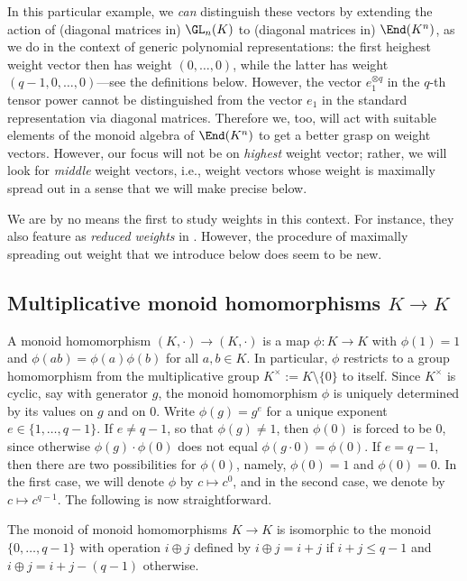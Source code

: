 \documentclass{amsart}
\begin{document}
In this particular example, we {\em can} distinguish these vectors by
extending the action of (diagonal matrices in) $\GL_n(K)$ to (diagonal
matrices in) $\End(K^n)$, as we do in the context of generic polynomial
representations: the first heighest weight vector then has weight
$(0,\ldots,0)$, while the latter has weight $(q-1,0,\ldots,0)$---see
the definitions below. However, the vector $e_1^{\otimes q}$ in the
$q$-th tensor power cannot be distinguished from the vector $e_1$ in
the standard representation via diagonal matrices. Therefore we, too,
will act with suitable elements of the monoid algebra of $\End(K^n)$
to get a better grasp on weight vectors. However, our focus will not be
on {\em highest} weight vector; rather, we will look for {\em middle}
weight vectors, i.e., weight vectors whose weight is
maximally spread out in a sense that we will make precise
below.

We are by no means the first to study weights in this
context. For instance, they also feature as {\em reduced weights} in
\cite{Kuhn94b}. However, the procedure of maximally spreading out weight
that we introduce below does seem to be new.

\subsection{Multiplicative monoid homomorphisms $K \to K$}

A monoid homomorphism $(K, \cdot) \to (K,\cdot)$ is a map $\phi:K \to
K$ with $\phi(1)=1$ and $\phi(ab)=\phi(a) \phi(b)$ for all $a,b \in
K$. In particular, $\phi$ restricts to a group homomorphism from the
multiplicative group $K^\times:=K \setminus \{0\}$ to itself. Since
$K^\times$ is cyclic, say with generator $g$, the monoid homomorphism
$\phi$ is uniquely determined by its values on $g$ and on $0$. Write
$\phi(g)=g^e$ for a unique exponent $e \in \{1,\ldots,q-1\}$. If $e
\neq q-1$, so that $\phi(g) \neq 1$, then $\phi(0)$ is forced to be
$0$, since otherwise $\phi(g) \cdot \phi(0)$ does not equal $\phi(g
\cdot 0)=\phi(0)$. If $e = q-1$, then there are two possibilities for
$\phi(0)$, namely, $\phi(0)=1$ and $\phi(0)=0$. In the first case,
we will denote $\phi$ by $c \mapsto c^0$, and in the second case, we
denote by $c \mapsto c^{q-1}$. The following is now straightforward.

\begin{lm} \label{lm:MonHomIso}
The monoid of monoid homomorphisms $K \to K$ is isomorphic to the monoid
$\{0,\ldots,q-1\}$ with operation $i \oplus j$ defined by $i \oplus j=i+j$
if $i+j \leq q-1$ and $i \oplus j = i+j-(q-1)$ otherwise.
\end{lm}
\end{document}
